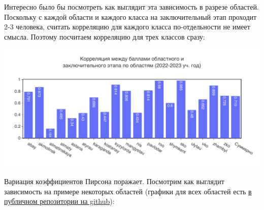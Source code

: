 Интересно было бы посмотреть как выглядит эта зависимость в разрезе областей. Поскольку с каждой области и каждого класса на заключительный этап проходит 2-3 человека, считать корреляцию для каждого класса по-отдельности не имеет смысла. Поэтому посчитаем корреляцию для трех классов сразу:

\includegraphics[width=\linewidth]{../export/pdf/trajectory/byoblast.pdf}

Вариация коэффициентов Пирсона поражает. Посмотрим как выглядит зависимость на примере некоторых областей (графики для всех областей есть \href{https://github.com/anmorgunov/respa-data-analysis/tree/main/export/pdf/trajectory}{в публичном репозитории на github}):

